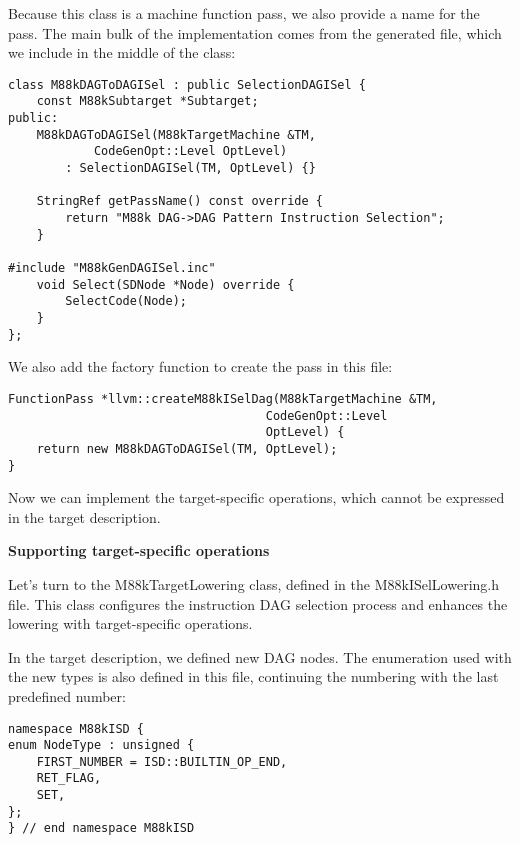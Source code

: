 Because this class is a machine function pass, we also provide a name for the pass. The main bulk of the implementation comes from the generated file, which we include in the middle of the class:\par

\begin{lstlisting}[caption={}]
class M88kDAGToDAGISel : public SelectionDAGISel {
	const M88kSubtarget *Subtarget;
public:
	M88kDAGToDAGISel(M88kTargetMachine &TM,
			CodeGenOpt::Level OptLevel)
		: SelectionDAGISel(TM, OptLevel) {}
		
	StringRef getPassName() const override {
		return "M88k DAG->DAG Pattern Instruction Selection";
	}

#include "M88kGenDAGISel.inc"
	void Select(SDNode *Node) override {
		SelectCode(Node);
	}
};
\end{lstlisting}

We also add the factory function to create the pass in this file:\par

\begin{lstlisting}[caption={}]
FunctionPass *llvm::createM88kISelDag(M88kTargetMachine &TM,
									CodeGenOpt::Level
									OptLevel) {
	return new M88kDAGToDAGISel(TM, OptLevel);
}
\end{lstlisting}

Now we can implement the target-specific operations, which cannot be expressed in the target description.\par

\hspace*{\fill} \par %
\textbf{Supporting target-specific operations}

Let's turn to the M88kTargetLowering class, defined in the M88kISelLowering.h file. This class configures the instruction DAG selection process and enhances the lowering with target-specific operations.\par

In the target description, we defined new DAG nodes. The enumeration used with the new types is also defined in this file, continuing the numbering with the last predefined number:\par

\begin{lstlisting}[caption={}]
namespace M88kISD {
enum NodeType : unsigned {
	FIRST_NUMBER = ISD::BUILTIN_OP_END,
	RET_FLAG,
	SET,
};
} // end namespace M88kISD
\end{lstlisting}

